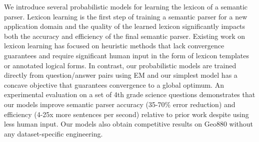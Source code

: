 We introduce several probabilistic models for learning the lexicon of a semantic parser. Lexicon learning is the first step of training a semantic parser for a new application domain and the quality of the learned lexicon significantly impacts both the accuracy and efficiency of the final semantic parser. Existing work on lexicon learning has focused on heuristic methods that lack convergence guarantees and require significant human input in the form of lexicon templates or annotated logical forms. In contrast, our probabilistic models are trained directly from question/answer pairs using EM and our simplest model has a concave objective that guarantees convergence to a global optimum. An experimental evaluation on a set of 4th grade science questions demonstrates that our models improve semantic parser accuracy (35-70\% error reduction) and efficiency (4-25x more sentences per second) relative to prior work despite using less human input. Our models also obtain competitive results on Geo880 without any dataset-specific engineering.
